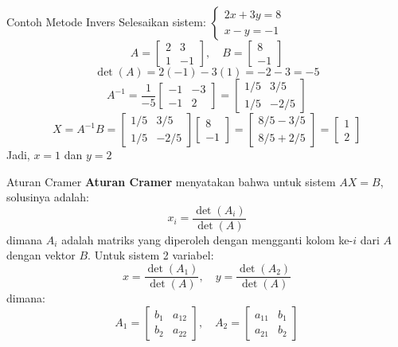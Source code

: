 \documentclass{beamer}
\begin{document}
\begin{frame}[t,fragile]{Contoh Metode Invers}
Selesaikan sistem: $\begin{cases} 2x + 3y = 8 \\ x - y = -1 \end{cases}$
\vspace{0.2cm}
$$ A = \begin{bmatrix} 2 & 3 \\ 1 & -1 \end{bmatrix}, \quad B = \begin{bmatrix} 8 \\ -1 \end{bmatrix} $$
$$ \det(A) = 2(-1) - 3(1) = -2 - 3 = -5 $$
$$ A^{-1} = \frac{1}{-5} \begin{bmatrix} -1 & -3 \\ -1 & 2 \end{bmatrix} = \begin{bmatrix} 1/5 & 3/5 \\ 1/5 & -2/5 \end{bmatrix} $$
$$ X = A^{-1}B = \begin{bmatrix} 1/5 & 3/5 \\ 1/5 & -2/5 \end{bmatrix} \begin{bmatrix} 8 \\ -1 \end{bmatrix} = \begin{bmatrix} 8/5 - 3/5 \\ 8/5 + 2/5 \end{bmatrix} = \begin{bmatrix} 1 \\ 2 \end{bmatrix} $$
Jadi, $x = 1$ dan $y = 2$
\end{frame}

\begin{frame}[t,fragile]{Aturan Cramer}
\textbf{Aturan Cramer} menyatakan bahwa untuk sistem $AX = B$, solusinya adalah:
$$ x_i = \frac{\det(A_i)}{\det(A)} $$
dimana $A_i$ adalah matriks yang diperoleh dengan mengganti kolom ke-$i$ dari $A$ dengan vektor $B$.
\vspace{0.3cm}
Untuk sistem 2 variabel:
$$ x = \frac{\det(A_1)}{\det(A)}, \quad y = \frac{\det(A_2)}{\det(A)} $$
dimana:
$$ A_1 = \begin{bmatrix} b_1 & a_{12} \\ b_2 & a_{22} \end{bmatrix}, \quad A_2 = \begin{bmatrix} a_{11} & b_1 \\ a_{21} & b_2 \end{bmatrix} $$
\end{frame}
\end{document}
